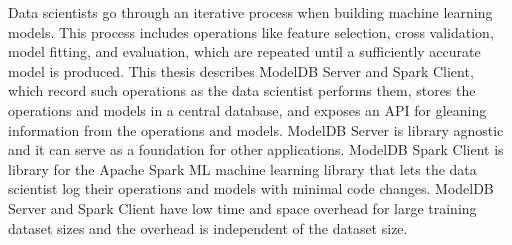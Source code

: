 % 
% 
%
Data scientists go through an iterative process when building machine learning
models. This process includes operations like feature selection, cross validation, 
model fitting, and evaluation, which are repeated until a sufficiently accurate 
model is produced. This thesis describes ModelDB Server and Spark Client,
which record such operations as the data scientist performs them, stores the operations
and models in a central database, and exposes an API for gleaning information from the operations and models. 
ModelDB Server is library agnostic and it can serve as a foundation for other applications.
ModelDB Spark Client is library for the Apache Spark ML machine learning library that 
lets the data scientist log their operations and models with minimal code changes.
ModelDB Server and Spark Client have low time and space overhead for large training
dataset sizes and the overhead is independent of the dataset size.
